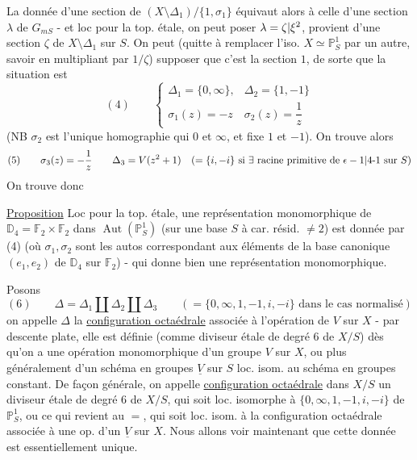 La donnée d'une section de $(X\setminus\Delta_1)/\{1,\sigma_1\}$ équivaut alors à celle d'une section $\lambda$ de $G_{mS}$ - et loc pour la top. étale, on peut poser $\lambda=\zeta|\xi^2$,    \inserted{$\lambda$} provient d'une section $\zeta$ de $X\setminus\Delta_1$ sur $S$. On peut (quitte à remplacer l'iso. $X\simeq\mathbb P^1_S$ par un autre, savoir en multipliant par $1/\zeta$) supposer que c'est la section $1$, de sorte que la situation  est
\[
(4)\qquad\left\{\begin{array}{ll}
\Delta_1=\{0,\infty\},&\Delta_2=\{1,-1\}\\[1ex]
\sigma_1(z)=-z&\sigma_2(z)=\dfrac1z
\end{array}\right.
\]
(NB $\sigma_2$ est l'unique homographie qui  $0$ et $\infty$, et fixe $1$ et $-1$). On trouve alors
\[
(5)\qquad\sigma_3(z)=-\frac1z\qquad
\Delta_3=V(z^2+1)\quad(=\{i,-i\}\text{ si }\exists\text{ racine primitive de }\epsilon-1|4\text{-}1\text{ sur }S)
\]
On trouve donc

\uline{Proposition} Loc pour la top. étale, une représentation monomorphique de $\mathbb D_4=\mathbb F_2\times\mathbb F_2$ dans $\operatorname{Aut}(\mathbb P^1_S)$ (sur une base $S$ à car. résid. $\ne2$) est donnée par (4) (où $\sigma_1,\sigma_2$ sont les autos correspondant aux éléments de la base canonique $(e_1,e_2)$ de $\mathbb D_4$ sur $\mathbb F_2$) - qui donne bien une représentation monomorphique.

Posons
\[
(6)\qquad\Delta=\Delta_1\amalg\Delta_2\amalg\Delta_3
\qquad(=\{0,\infty,1,-1,i,-i\}\text{ dans le cas normalisé})
\]
on appelle $\Delta$ la \uline{configuration octaédrale} associée à l'opération de $V$ sur \deleted{$\unsure{\leftarrow}$} $X$ - par descente plate, elle est définie (comme diviseur étale de degré $6$ de $X/S$) dès qu'on a une opération monomorphique  d'un groupe $V$  sur $X$, ou plus généralement d'un schéma en groupes $\underline V$ sur $S$ loc. isom. au schéma en groupes constant.  De façon générale, on appelle \uline{configuration octaédrale} dans $X/S$ un diviseur étale de degré $6$ de $X/S$, qui soit
loc. isomorphe à $\{0,\infty,1,-1,i,-i\}$ de $\mathbb P^1_S$, ou ce qui revient au $=$, qui soit loc. isom. à la configuration octaédrale associée à une op.  d'un $\underline V$ sur $X$. Nous allons voir maintenant que cette donnée est essentiellement unique.

